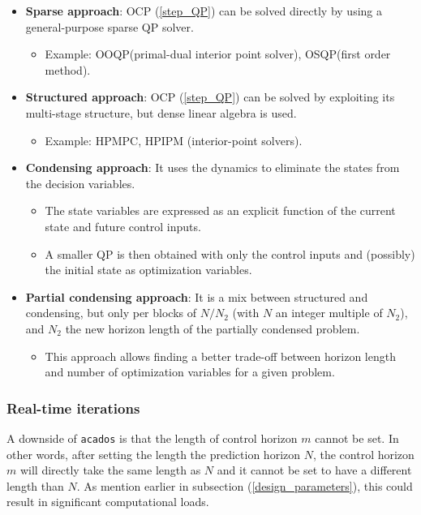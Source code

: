 \documentclass{thesisreport}
\begin{document}
	\begin{itemize}
        \item \textbf{Sparse approach}: OCP (\ref{step_QP}) can be solved directly by using a general-purpose sparse QP solver. 
        \begin{itemize}
            \item Example: OOQP(primal-dual interior point solver), OSQP(first order method).
        \end{itemize}
        \item \textbf{Structured approach}: OCP (\ref{step_QP}) can be solved by exploiting its multi-stage structure, but dense linear algebra is used. 
        \begin{itemize}
            \item Example: HPMPC, HPIPM (interior-point solvers).
        \end{itemize}
        \item \textbf{Condensing approach}: It uses the dynamics to eliminate the states from the decision variables.
        \begin{itemize}
            \item The state variables are expressed as an explicit function of the current state and future control inputs.
            \item A smaller QP is then obtained with only the control inputs and (possibly) the initial state as optimization variables.
        \end{itemize}
        \item \textbf{Partial condensing approach}: It is a mix between structured and condensing, but only per blocks of $N/N_2$ (with $N$ an integer multiple of $N_2$), and $N_2$ the new horizon length of the partially condensed problem.
        \begin{itemize}
            \item This approach allows finding a better trade-off between horizon length and number of optimization variables for a given problem.
        \end{itemize}
    \end{itemize}

\subsubsection{Real-time iterations}

A downside of \texttt{acados} is that the length of control horizon $m$ cannot be set. In other words, after setting the length the prediction horizon $N$, the control horizon $m$ will directly take the same length as $N$ and it cannot be set to have a different length than $N$. As mention earlier in subsection (\ref{design_parameters}), this could result in significant computational loads.
\end{document}
